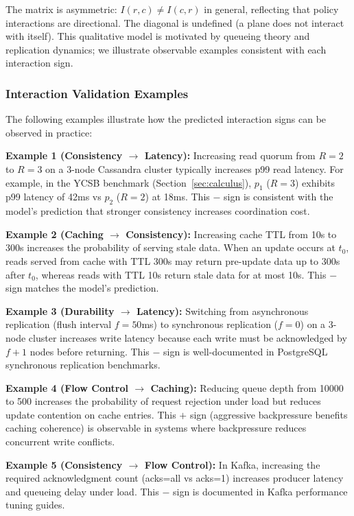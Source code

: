 \documentclass[conference]{IEEEtran}
\begin{document}
The matrix is asymmetric: $I(r,c) \neq I(c,r)$ in general, reflecting that policy interactions are directional. The diagonal is undefined (a plane does not interact with itself). This qualitative model is motivated by queueing theory and replication dynamics; we illustrate observable examples consistent with each interaction sign.

\subsubsection{Interaction Validation Examples}

The following examples illustrate how the predicted interaction signs can be observed in practice:

\textbf{Example 1 (Consistency $\to$ Latency):} Increasing read quorum from $R=2$ to $R=3$ on a 3-node Cassandra cluster typically increases p99 read latency. For example, in the YCSB benchmark (Section~\ref{sec:calculus}), $p_1$ ($R=3$) exhibits p99 latency of 42ms vs $p_2$ ($R=2$) at 18ms. This $-$ sign is consistent with the model's prediction that stronger consistency increases coordination cost.

\textbf{Example 2 (Caching $\to$ Consistency):} Increasing cache TTL from 10s to 300s increases the probability of serving stale data. When an update occurs at $t_0$, reads served from cache with TTL 300s may return pre-update data up to 300s after $t_0$, whereas reads with TTL 10s return stale data for at most 10s. This $-$ sign matches the model's prediction.

\textbf{Example 3 (Durability $\to$ Latency):} Switching from asynchronous replication (flush interval $f=50$ms) to synchronous replication ($f=0$) on a 3-node cluster increases write latency because each write must be acknowledged by $f+1$ nodes before returning. This $-$ sign is well-documented in PostgreSQL synchronous replication benchmarks.

\textbf{Example 4 (Flow Control $\to$ Caching):} Reducing queue depth from 10000 to 500 increases the probability of request rejection under load but reduces update contention on cache entries. This $+$ sign (aggressive backpressure benefits caching coherence) is observable in systems where backpressure reduces concurrent write conflicts.

\textbf{Example 5 (Consistency $\to$ Flow Control):} In Kafka, increasing the required acknowledgment count (acks=all vs acks=1) increases producer latency and queueing delay under load. This $-$ sign is documented in Kafka performance tuning guides.
\end{document}
